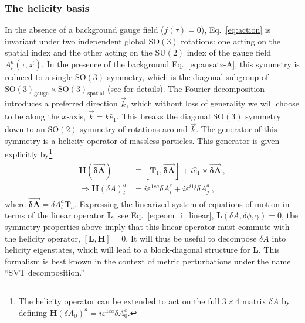 \subsubsection{The helicity basis}
\label{sec:helbas}

In the absence of a background gauge field ($f(\tau) = 0$), Eq.~\eqref{eq:action} is invariant under two independent global $\mathrm{SO}(3)$ rotations: one acting on the spatial index and the other acting on the  $\mathrm{SU}(2)$ index of the gauge field $A^a_i(\tau, \vec x)$. In the presence of the background Eq.~\eqref{eq:ansatz-A}, this symmetry is reduced to a single $\mathrm{SO}(3)$ symmetry, which is the diagonal subgroup of $\mathrm{SO}(3)_\text{gauge} \times \mathrm{SO}(3)_\text{spatial}$ (see   for details). The Fourier decomposition introduces a preferred direction $\vec k$, which without loss of generality we will choose to be along the $x$-axis, $\vec k = k \hat e_1$. This breaks the diagonal $\mathrm{SO}(3)$ symmetry down to an $\mathrm{SO}(2)$ symmetry of rotations around $\vec k$.  The generator of this symmetry is a helicity operator of massless particles. This generator is given explicitly by\footnote{ The helicity operator can be extended to act on the full $3\times4$ matrix $\delta A$ by defining $\mathbf{H}(\delta  A_0)^a  =  i \varepsilon^{1 c a } \delta A^c_0$.} 
\begin{align}
  \mathbf{H}(\overrightarrow{\mathbf{\delta  A}}) & \equiv [\mathbf{T}_1, \overrightarrow{\mathbf{\delta  A}}] + i \hat e_1 \times  \overrightarrow{\mathbf{\delta  A}} \,, \nonumber 
 \\
  \Rightarrow \mathbf{H}(\delta  A)^a_i & = i \varepsilon^{1 c a } \delta A^c_i + i \varepsilon^{i1j} \delta A^a_j  \,,
     \label{eq:helicity_operator}
\end{align}
where $\overrightarrow{\mathbf{\delta  A}} = \delta A^a_i \mathbf{T}_a$. 
Expressing the linearized system of equations of motion in terms of the linear operator $\mathbf L$, see Eq.~\eqref{eq:eom_i_linear}, 
 $\mathbf{L}(\delta A, \delta \phi, \gamma) = 0 $,
the symmetry properties above imply that this linear operator must commute with the helicity operator, $[\mathbf{L}, \mathbf{H} ] = 0$. It will thus be useful to decompose $\delta A$ into helicity eigenstates, which will lead to a block-diagonal structure for $\mathbf{L}$.  This formalism is best known in the context of metric perturbations under the name ``SVT decomposition.''

